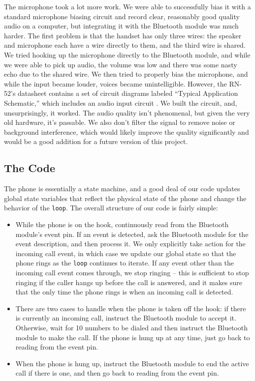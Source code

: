 \documentclass{es50report}
\begin{document}
    The microphone took a lot more work. We were able to successfully bias it with a standard microphone biasing circuit and record clear, reasonably good quality audio on a computer, but integrating it with the Bluetooth module was much harder. The first problem is that the handset has only three wires: the speaker and microphone each have a wire directly to them, and the third wire is shared. We tried hooking up the microphone directly to the Bluetooth module, and while we were able to pick up audio, the volume was low and there was some nasty echo due to the shared wire. We then tried to properly bias the microphone, and while the input became louder, voices became unintelligible. However, the RN-52's datasheet contains a set of circuit diagrams labeled ``Typical Application Schematic,'' which includes an audio input circuit \cite{rn52Datasheet}. We built the circuit, and, unsurprisingly, it worked. The audio quality isn't phenomenal, but given the very old hardware, it's passable. We also don't filter the signal to remove noise or background interference, which would likely improve the quality significantly and would be a good addition for a future version of this project.

    \subsection{The Code}
    The phone is essentially a state machine, and a good deal of our code updates global state variables that reflect the physical state of the phone and change the behavior of the \verb+loop+. The overall structure of our code is fairly simple:
    \begin{itemize}
        \item While the phone is on the hook, continuously read from the Bluetooth module's event pin. If an event is detected, ask the Bluetooth module for the event description, and then process it. We only explicitly take action for the incoming call event, in which case we update our global state so that the phone rings as the \verb+loop+ continues to iterate. If any event other than the incoming call event comes through, we stop ringing -- this is sufficient to stop ringing if the caller hangs up before the call is answered, and it makes sure that the only time the phone rings is when an incoming call is detected.
        \item There are two cases to handle when the phone is taken off the hook: if there is currently an incoming call, instruct the Bluetooth module to accept it. Otherwise, wait for 10 numbers to be dialed and then instruct the Bluetooth module to make the call. If the phone is hung up at any time, just go back to reading from the event pin.
        \item When the phone is hung up, instruct the Bluetooth module to end the active call if there is one, and then go back to reading from the event pin.
    \end{itemize}
\end{document}
